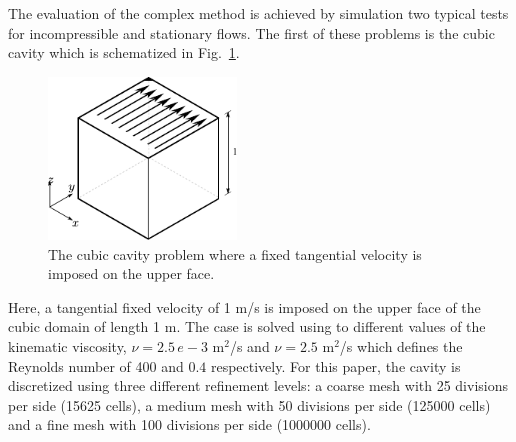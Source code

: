 \documentclass[final,3p,times,10pt,onecolumn]{myElsarticle}
\numberwithin{equation}{section}
\begin{document}
The evaluation of the complex method is achieved by simulation  two typical tests for incompressible and stationary flows. The first of these problems is the cubic cavity which is schematized in Fig.~\ref{Fig:Cavity}.
\begin{figure}[t!]
\centering
\includegraphics[width=5cm]{fig/Cases/Cavity.pdf}
\caption{The cubic cavity problem where a fixed tangential velocity is imposed on the upper face.}
\label{Fig:Cavity}
\end{figure} 
Here, a tangential fixed velocity of 1 m/s is imposed on the upper face of the cubic domain of length 1 m. The case is solved using to different values of the kinematic viscosity, $\nu = 2.5\, e-3$ m$^2$/s and $\nu = 2.5$ m$^2$/s which defines the Reynolds number of 400 and $0.4$ respectively. For this paper, the cavity is discretized using three different refinement levels: a coarse mesh with 25 divisions per side (15625 cells), a medium mesh with 50 divisions per side (125000 cells) and a fine mesh with 100 divisions per side (1000000 cells).
\end{document}
